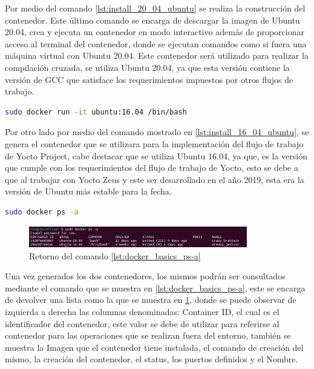 Por medio del comando \ref{lst:install_20_04_ubuntu} se realiza la construcción del contenedor. Este último comando se encarga de descargar la imagen de Ubuntu 20.04, crea y ejecuta un contenedor en modo interactivo además de proporcionar acceso al terminal del contenedor, donde se ejecutan comandos como si fuera una máquina virtual con Ubuntu 20.04. Este contenedor será utilizado para realizar la compilación cruzada, se utiliza Ubuntu 20.04, ya que esta versión contiene la versión de GCC que satisface los requerimientos impuestos por otros flujos de trabajo.

\begin{lstlisting}[language=bash, caption={Instalacion de Ubuntu 16.04, Linux}, label=lst:install_16_04_ubuntu]
    sudo docker run -it ubuntu:16.04 /bin/bash
\end{lstlisting}

Por otro lado por medio del comando mostrado en \ref{lst:install_16_04_ubuntu}, se genera el contenedor que se utilizara para la implementación del flujo de trabajo de Yocto Project, cabe destacar que se utiliza Ubuntu 16.04, ya que, es la versión que cumple con los requerimientos del flujo de trabajo de Yocto, esto se debe a que al trabajar con Yocto Zeus y este ser desarrollado en el año 2019, esta era la versión de Ubuntu más estable para la fecha. 

\begin{lstlisting}[language=bash, caption={Lista de contenedores del sistema, Docker}, label=lst:docker_basics_ps-a]
    sudo docker ps -a
\end{lstlisting}

\begin{figure}[h!]
    \centering
    \includegraphics[width=0.85\textwidth]{fig/especifico_2/retornos_de_comandos/sudo_docker_ps_a.png}
    \caption{Retorno del comando \ref{lst:docker_basics_ps-a}}
    \label{fig:sudo_docker_ps_a}
\end{figure}

Una vez generados los dos contenedores, los mismos podrán ser consultados mediante el comando que se muestra en \ref{lst:docker_basics_ps-a}, este se encarga de devolver una lista como la que se muestra en \ref{fig:sudo_docker_ps_a}, donde se puede observar de izquierda a derecha las columnas denominadas: Container ID, el cual es el identificador del contenedor, este valor se debe de utilizar para referirse al contenedor para las operaciones que se realizan fuera del entorno, también se muestra la Imagen que el contenedor tiene instalada, el comando de creación del mismo, la creación del contenedor, el status, los puertos definidos y el Nombre.

